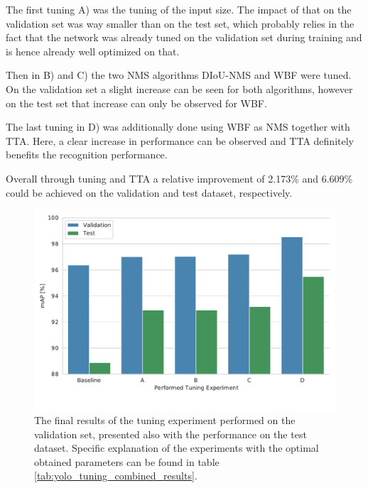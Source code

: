 The first tuning A) was the tuning of the input size.
The impact of that on the validation set was way smaller than on the test set, which probably relies in the fact that the network was already tuned on the validation set during training and is hence already well optimized on that.

Then in B) and C) the two \ac{NMS} algorithms \ac{DIoU}-\ac{NMS} and \ac{WBF} were tuned.
On the validation set a slight increase can be seen for both algorithms, however on the test set that increase can only be observed for \ac{WBF}.

The last tuning in D) was additionally done using \ac{WBF} as \ac{NMS} together with \ac{TTA}.
Here, a clear increase in performance can be observed and \ac{TTA} definitely benefits the recognition performance.

Overall through tuning and \ac{TTA} a relative improvement of 2.173\% and 6.609\% could be achieved on the validation and test dataset, respectively.

\begin{figure}
\begin{center}
    \includegraphics[width=\columnwidth]{imgs/yolo_all_tuning.pdf}
    \caption{The final results of the tuning experiment performed on the validation set, presented also with the performance on the test dataset. Specific explanation of the experiments with the optimal obtained parameters can be found in table \ref{tab:yolo_tuning_combined_results}.}
    \label{fig:yolo_tuning_combined_results}
\end{center}
\end{figure}

